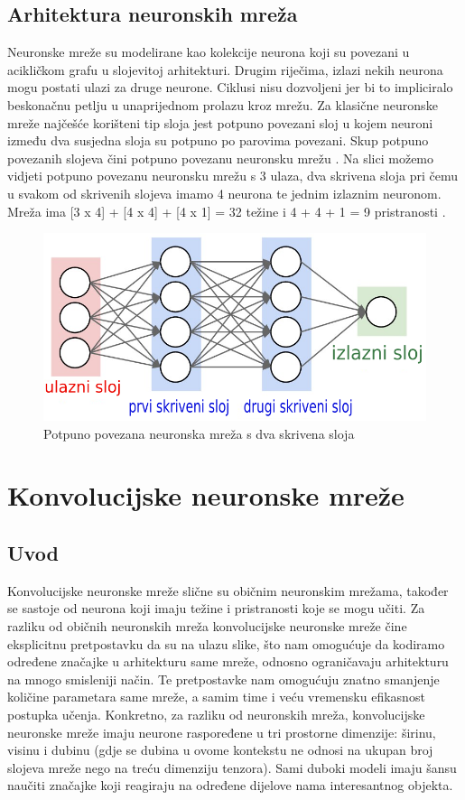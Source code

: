 \documentclass[times, utf8, diplomski]{fer}
\theoremstyle{definition}
\begin{document}
\section{Arhitektura neuronskih mreža}
Neuronske mreže su modelirane kao kolekcije neurona koji su povezani u acikličkom grafu u slojevitoj arhitekturi. Drugim riječima, izlazi nekih neurona mogu postati ulazi za druge neurone. Ciklusi nisu dozvoljeni jer bi to impliciralo beskonačnu petlju u unaprijednom prolazu kroz mrežu. Za klasične neuronske mreže najčešće korišteni tip sloja jest potpuno povezani sloj  u kojem neuroni između dva susjedna sloja su potpuno po parovima povezani. Skup potpuno povezanih slojeva čini potpuno povezanu neuronsku mrežu . Na slici možemo vidjeti potpuno povezanu neuronsku mrežu s 3 ulaza, dva skrivena sloja pri čemu u svakom od skrivenih slojeva imamo 4 neurona te jednim izlaznim neuronom. Mreža ima [3 x 4] + [4 x 4] + [4 x 1] = 32 težine i 4 + 4 + 1 = 9 pristranosti .
\begin{figure}[H]
\centering
\includegraphics[scale=0.5]{neural_net2.png}
\caption{Potpuno povezana neuronska mreža s dva skrivena sloja}
\end{figure}


\chapter{Konvolucijske neuronske mreže}
\section{Uvod}
Konvolucijske neuronske mreže slične su običnim neuronskim mrežama, također se sastoje od neurona koji imaju težine i pristranosti koje se mogu učiti. Za razliku od običnih neuronskih mreža konvolucijske neuronske mreže čine eksplicitnu pretpostavku da su na ulazu slike, što nam omogućuje da kodiramo određene značajke u arhitekturu same mreže, odnosno ograničavaju arhitekturu na mnogo smisleniji način. Te pretpostavke nam omogućuju znatno smanjenje količine parametara same mreže, a samim time i veću vremensku efikasnost postupka učenja. Konkretno, za razliku od neuronskih mreža, konvolucijske neuronske mreže imaju neurone raspoređene u tri prostorne dimenzije: širinu, visinu i dubinu (gdje se dubina u ovome kontekstu ne odnosi na ukupan broj slojeva mreže nego na treću dimenziju tenzora). Sami duboki modeli imaju šansu naučiti značajke koji reagiraju na određene dijelove nama interesantnog objekta.
\end{document}
